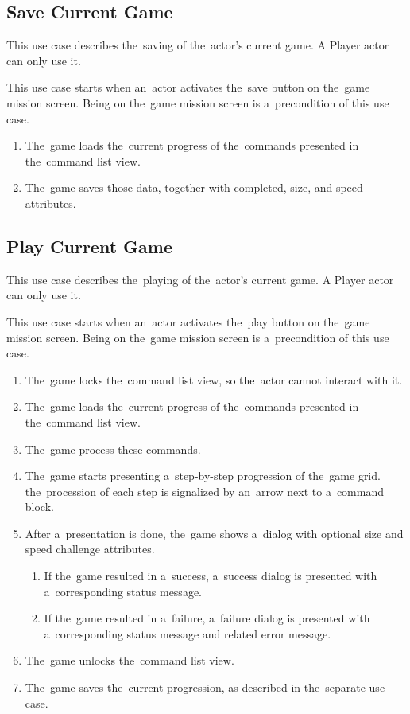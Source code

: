 \subsection{Save Current Game}

This use case describes the~saving of the~actor's current game.
A Player actor can only use it.

This use case starts when an~actor activates the~save button on the~game mission screen.
Being on the~game mission screen is a~precondition of this use case.

\begin{enumerate}
    \item The~game loads the~current progress of the~commands presented in the~command list view.
    \item The~game saves those data, together with completed, size, and speed attributes. 
\end{enumerate}

\subsection{Play Current Game}

This use case describes the~playing of the~actor's current game.
A Player actor can only use it.

This use case starts when an~actor activates the~play button on the~game mission screen.
Being on the~game mission screen is a~precondition of this use case.

\begin{enumerate}
    \item The~game locks the~command list view, so the~actor cannot interact with it. 
    \item The~game loads the~current progress of the~commands presented in the~command list view.
    \item The~game process these commands.
    \item The~game starts presenting a~step-by-step progression of the~game grid.
    the~procession of each step is signalized by an~arrow next to a~command block.
    \item After a~presentation is done, the~game shows a~dialog with optional size and speed challenge attributes.
    \begin{enumerate}
        \item If the~game resulted in a~success, a~success dialog is presented with a~corresponding status message.
        \item If the~game resulted in a~failure, a~failure dialog is presented with a~corresponding status message and related error message.
    \end{enumerate}
    \item The~game unlocks the~command list view.
    \item The~game saves the~current progression, as described in the~separate use case. 
\end{enumerate}

